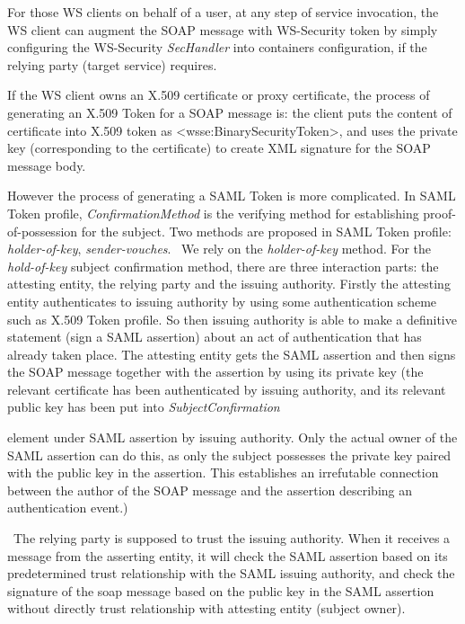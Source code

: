 \documentclass{article}
\begin{document}
For those WS clients on behalf of a user, at any step of service
invocation, the WS client can augment the SOAP message with WS-Security
token by simply configuring the WS-Security \textit{SecHandler} into
container{\textquotesingle}s configuration, if the relying party
(target service) requires. 

If the WS client owns an X.509 certificate or proxy certificate, the
process of generating an X.509 Token for a SOAP message is: the client
puts the content of certificate into X.509 token as
{\textless}wsse:BinarySecurityToken{\textgreater}, and uses the private
key (corresponding to the certificate) to create XML signature for the
SOAP message body. 

However the process of generating a SAML Token is more complicated. In
SAML Token profile, \textit{ConfirmationMethod} is the verifying method
for establishing proof-of-possession for the subject. Two methods are
proposed in SAML Token profile: \textit{holder-of-key},
\textit{sender-vouches}. \ We rely on the \textit{holder-of-key
}method. For the \textit{hold-of-key} subject confirmation method,
there are three interaction parts: the attesting entity, the relying
party and the issuing authority. Firstly the attesting entity
authenticates to issuing authority by using some authentication scheme
such as X.509 Token profile. So then issuing authority is able to make
a definitive statement (sign a SAML assertion) about an act of
authentication that has already taken place. The attesting entity gets
the SAML assertion and then signs the SOAP message together with the
assertion by using its private key (the relevant certificate has been
authenticated by issuing authority, and its relevant public key has
been put into \textit{SubjectConfirmation} 

element under SAML assertion by issuing authority. Only the actual owner
of the SAML assertion can do this, as only the subject possesses the
private key paired with the public key in the assertion. This
establishes an irrefutable connection between the author of the SOAP
message and the assertion describing an authentication event.) 

\ The relying party is supposed to trust the issuing authority. When it
receives a message from the asserting entity, it will check the SAML
assertion based on its predetermined trust relationship with the SAML
issuing authority, and check the signature of the soap message based on
the public key in the SAML assertion without directly trust
relationship with attesting entity (subject owner). 
\end{document}
